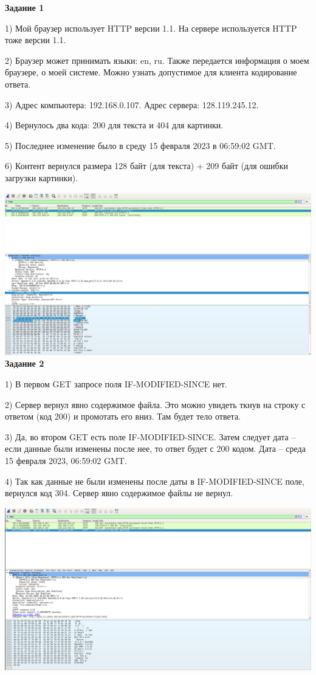 \documentclass[11pt]{article}
\begin{document}
{\bf Задание 1}

    1) Мой браузер использует HTTP версии 1.1.
    На сервере используется HTTP тоже версии 1.1.

    2) Браузер может принимать языки: en, ru.
    Также передается информация о моем браузере, о моей системе.
    Можно узнать допустимое для клиента кодирование ответа.

    3) Адрес компьютера: 192.168.0.107.
    Адрес сервера: 128.119.245.12.

    4) Вернулось два кода: 200 для текста и 404 для картинки.

    5) Последнее изменение было в среду 15 февраля 2023 в 06:59:02 GMT.

    6) Контент вернулся размера 128 байт (для текста) + 209 байт (для ошибки загрузки картинки).

    \includegraphics[width=\textwidth]{1.png}\\

    {\bf Задание 2}

    1) В первом GET запросе поля IF-MODIFIED-SINCE нет.

    2) Сервер вернул явно содержимое файла.
    Это можно увидеть ткнув на строку с ответом (код 200) и промотать его вниз.
    Там будет тело ответа.

    3) Да, во втором GET есть поле IF-MODIFIED-SINCE.
    Затем следует дата -- если данные были изменены после нее, то ответ будет с 200 кодом.
    Дата -- среда 15 февраля 2023, 06:59:02 GMT.

    4) Так как данные не были изменены после даты в IF-MODIFIED-SINCE поле, вернулся код 304.
    Сервер явно содержимое файлы не вернул.

    \includegraphics[width=\textwidth]{2.png}\\
\end{document}
